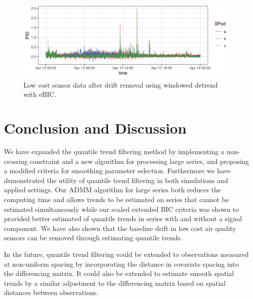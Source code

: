 \documentclass[aoas]{imsart}
\begin{document}
\begin{figure}
	\includegraphics[width = \linewidth]{Figures/corrected_data.png}
	\caption{Low cost sensor data after drift removal using windowed detrend with eBIC.}
\end{figure}



\section{Conclusion and Discussion}
\label{sec:discussion}

We have expanded the quantile trend filtering method by implementing a non-crossing constraint and a new algorithm for processing large series, and proposing a modified criteria for smoothing parameter selection. Furthermore we have demonstrated the utility of quantile trend filtering in both simulations and applied settings. Our ADMM algorithm for large series both reduces the computing time and allows trends to be estimated on series that cannot be estimated simultaneously while our scaled extended BIC criteria was shown to provided better estimated of quantile trends in series with and without a signal component. We have also shown that the baseline drift in low cost air quality sensors can be removed through estimating quantile trends.

In the future, quantile trend filtering could be extended to observations measured at non-uniform spacing by incorporating the distance in covariate spacing into the differencing matrix. It could also be extended to estimate smooth spatial trends by a similar adjustment to the differencing matrix based on spatial distances between observations.

\label{sec:conc}

\end{document}
